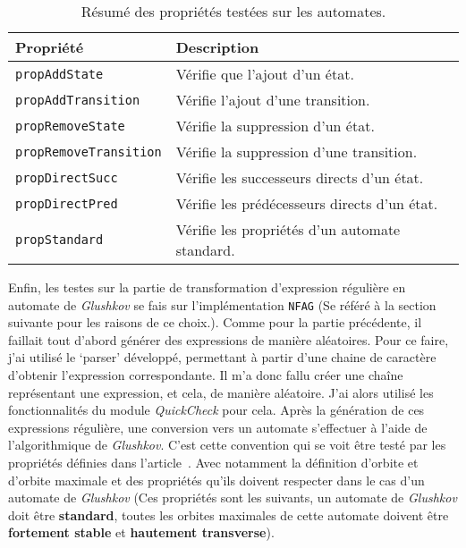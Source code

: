 \begin{table}[H]
  \centering
  \begin{tabular}{ll}
  \toprule
  \textbf{Propriété} & \textbf{Description} \\
  \midrule
  \texttt{propAddState} & Vérifie que l'ajout d'un état.\\
  \texttt{propAddTransition} & Vérifie l'ajout d'une transition.\\
  \texttt{propRemoveState} & Vérifie la suppression d'un état.\\
  \texttt{propRemoveTransition} & Vérifie la suppression d'une transition.\\
  \texttt{propDirectSucc} & Vérifie les successeurs directs d'un état.\\
  \texttt{propDirectPred} & Vérifie les prédécesseurs directs d'un état.\\
  \texttt{propStandard} & Vérifie les propriétés d'un automate standard.\\
  \bottomrule
  \end{tabular}
  \caption{Résumé des propriétés testées sur les automates.}\label{tab:proprietes}
  \end{table}

\vphantom{}

Enfin, les testes sur la partie de transformation d'expression régulière en 
automate de \textit{Glushkov} se fais sur l'implémentation 
\texttt{NFAG} (Se référé à la section suivante pour les raisons de 
ce choix.). Comme pour la partie précédente, il faillait tout d'abord générer 
des expressions de manière aléatoires. Pour ce faire, j'ai utilisé le `parser' 
développé, permettant à partir d'une chaine de caractère d'obtenir l'expression
correspondante. Il m'a donc fallu créer une chaîne représentant une expression, 
et cela, de manière aléatoire. J'ai alors utilisé les fonctionnalités du module 
\textit{QuickCheck} pour cela. Après la génération de ces expressions régulière,
une conversion vers un automate s'effectuer à l'aide de l'algorithmique de 
\textit{Glushkov}. C'est cette convention qui se voit être testé par les 
propriétés définies dans l'article~\cite{CaronZiadi2001}. Avec notamment la 
définition d'orbite et d'orbite maximale et des propriétés qu'ils doivent 
respecter dans le cas d'un automate de \textit{Glushkov} (Ces propriétés sont 
les suivants, un automate de \textit{Glushkov} doit être \textbf{standard}, 
toutes les orbites maximales de cette automate doivent être 
\textbf{fortement stable} et \textbf{hautement transverse}).

